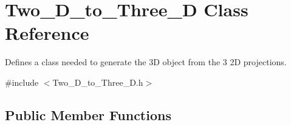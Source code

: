 \hypertarget{class_two___d__to___three___d}{}\section{Two\+\_\+\+D\+\_\+to\+\_\+\+Three\+\_\+D Class Reference}
\label{class_two___d__to___three___d}


Defines a class needed to generate the 3D object from the 3 2D projections.  




{\ttfamily \#include $<$Two\+\_\+\+D\+\_\+to\+\_\+\+Three\+\_\+\+D.\+h$>$}

\subsection*{Public Member Functions}
